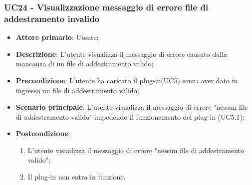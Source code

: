 \subsubsection{UC24 - Visualizzazione messaggio di errore file di addestramento invalido}
\label{sssec:uc24}
\begin{itemize}
  \item \textbf{Attore primario}: Utente;
  \item \textbf{Descrizione}: L'utente visualizza il messaggio di errore causato dalla mancanza di un file di addestramento valido;
  \item \textbf{Precondizione}: L'utente ha caricato il plug-in(UC5) senza aver dato in ingresso un file di addestramento valido;
  \item \textbf{Scenario principale}: L'utente visualizza il messaggio di errore "nessun file di addestramento valido" impedendo il funzionamento del plug-in (UC5.1);
  \item \textbf{Postcondizione}:
  \begin{enumerate}
		\item L'utente visualizza il messaggio di errore "nessun file di addestramento valido";
		\item Il plug-in non entra in funzione.
	\end{enumerate}
\end{itemize}

